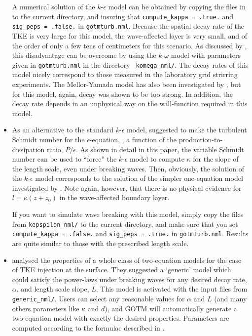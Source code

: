 \begin{itemize}
 A numerical solution of the $k$-$\epsilon$ model can be obtained by
 copying the files in  to the current
 directory, and insuring that {\tt compute\_kappa = .true.}  and {\tt
 sig\_peps = .false.} in {\tt gotmturb.nml}. Because the spatial decay
 rate of the TKE is very large for this model, the wave-affected layer
 is very small, and of the order of only a few tens of centimeters for
 this scenario.  As discussed by \cite{Umlaufetal2003}, this
 disadvantage can be overcome by using the $k$-$\omega$ model with
 parameters given in {\tt gotmturb.nml} in the directory {\tt
 komega\_nml/}. The decay rates of this model nicely correspond to
 those measured in the laboratory grid strirring experiments. The
 Mellor-Yamada model has also been investigated by
 \cite{Umlaufetal2003}, but for this model, again, decay was shown to
 be too strong. In addition, the decay rate depends in an unphysical
 way on the wall-function required in this model.

 \item As an alternative to the standard $k$-$\epsilon$ model,
 \cite{Burchard2001b} suggested to make the turbulent Schmidt number
 for the $\epsilon$-equation, , a function of the
 production-to-dissipation ratio, $P/\epsilon$. As shown in detail in
 this paper, the variable Schmidt number can be used to ``force'' the
 $k$-$\epsilon$ model to compute $\kappa$ for the slope of the length
 scale, even under breaking waves. Then, obviously, the solution of
 the $k$-$\epsilon$ model corresponds to the solution of the simpler
 one-equation model investigated by \cite{CraigBanner94}. Note again,
 however, that there is no physical evidence for $l = \kappa (z +
 z_0)$ in the wave-affected boundary layer.

 If you want to simulate wave breaking with this model, simply copy the
 files from {\tt kepspilon\_nml/} to the current directory, and make
 sure that you set {\tt compute\_kappa = .false.}  and {\tt sig\_peps
 = .true.} in {\tt gotmturb.nml}.  Results are quite similar to those
 with the prescribed length scale.

  
 \item \cite{UmlaufBurchard2003} analysed the properties of a whole
 class of two-equation models for the case of TKE injection at the
 surface. They suggested a `generic' model which could satisfy the
 power-laws under breaking waves for any desired decay rate,
 $\alpha$, and length scale slope, $L$.  This model is activated with
 the input files from {\tt generic\_nml/}.  Users can select any
 reasonable values for $\alpha$ and $L$ (and many others parameters like
 $\kappa$ and $d$), and GOTM will automatically generate a
 two-equation model with exactly the desired properties. Parameters
 are computed according to the formulae described in .

\end{itemize}

